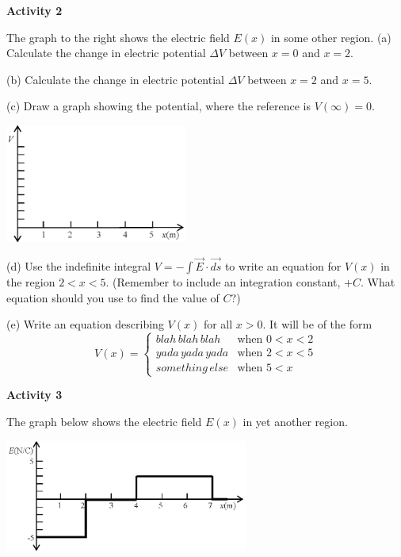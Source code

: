 \textbf{Activity 2} 

The graph to the right shows the electric field $E(x)$ in some other region.
(a) Calculate the change in electric potential $\Delta V$ between $x=0$ and $x=2$.
\answerspace{0.8in}

(b) Calculate the change in electric potential $\Delta V$ between $x=2$ and $x=5$.
\answerspace{0.7in}

(c) Draw a graph showing the potential, where the reference is $V(\infty)=0$.
\begin{center}
\includegraphics[width=0.45\textwidth]{finding_v_from_e/fig4.eps}
\end{center}

(d) Use the indefinite integral $V =-\int{\vec{E} \cdot \vec{ds}}$  to write an equation for $V(x)$ in the region $2<x<5$.  (Remember to include an integration constant, $+C$.  What equation should you use to find the value of $C$?)
\answerspace{1.0in}


(e) Write an equation describing $V(x)$ for all $x>0$.  It will be of the form
\begin{displaymath}
V(x) = \begin{cases}
        blah \, blah \, blah  & \textrm{when } 0<x<2\\
        yada \, yada \, yada & \textrm{when }  2<x<5\\
        something \, else & \textrm{when }  5 < x
        \end{cases}
\end{displaymath}

\answerspace{1.1in}

\pagebreak[2]
\textbf{Activity 3} 

The graph below shows the electric field $E(x)$ in yet another region.
\begin{center}
\includegraphics[width=0.6\textwidth]{finding_v_from_e/fig5.eps}
\end{center}

